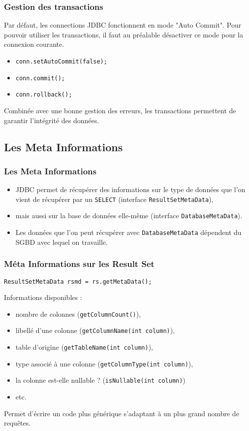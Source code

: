 \documentclass[xcolor=pdftex,x11names,table]{beamer}
\begin{document}
		\begin{frame}
    \frametitle{Gestion des transactions}
      Par défaut, les connections JDBC fonctionnent en mode "Auto Commit". Pour pouvoir utiliser les transactions, il 
      faut au préalable désactiver ce mode pour la connexion courante.
    	\begin{itemize}
    		\item \lstinline$conn.setAutoCommit(false);$
    		\item \lstinline$conn.commit();$
    		\item \lstinline$conn.rollback();$
			\end{itemize}
			Combinée avec une bonne gestion des erreurs, les transactions permettent de garantir l'intégrité des données.
		\end{frame}
		
		\subsection{Les Meta Informations}
		\begin{frame}
    \frametitle{Les Meta Informations}
    	\begin{itemize}
    		\item JDBC permet de récupérer des informations sur le type de données que l'on vient de récupérer par un 
    		\texttt{SELECT} (interface \lstinline$ResultSetMetaData$),
    		\item mais aussi sur la base de données elle-même (interface \lstinline$DatabaseMetaData$).
    		\item Les données que l’on peut récupérer avec \lstinline$DatabaseMetaData$ dépendent du SGBD avec lequel 
    		on travaille.
			\end{itemize}
		\end{frame}
		
		\begin{frame}
    \frametitle{Méta Informations sur les Result Set}
      \begin{block}{}
        \lstinline$ResultSetMetaData rsmd = rs.getMetaData();$
      \end{block}
    	Informations disponibles :
    	\begin{itemize}
    		\item nombre de colonnes (\lstinline$getColumnCount()$),
        \item libellé d'une colonne (\lstinline$getColumnName(int column)$),
        \item table d'origine (\lstinline$getTableName(int column)$),
        \item type associé à une colonne (\lstinline$getColumnType(int column)$),
        \item la colonne est-elle nullable ? (\lstinline$isNullable(int column)$)
        \item etc.
			\end{itemize}
			Permet d'écrire un code plus générique s'adaptant à un plus grand nombre de requêtes.
		\end{frame}
		
\end{document}
